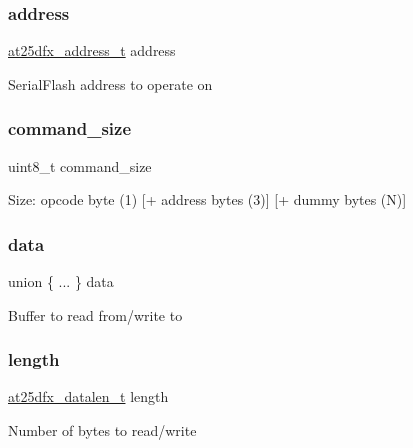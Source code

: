 \subsubsection{\texorpdfstring{address}{address}}
{\footnotesize\ttfamily \mbox{\hyperlink{group__asfdoc__common2__at25dfx__group_ga6797a814b041014cef23de480c9da9ef}{at25dfx\+\_\+address\+\_\+t}} address}

Serial\+Flash address to operate on \mbox{\label{structat25dfx__command_a524935062171f0d36ba3552566e448a2}} 
\subsubsection{\texorpdfstring{command\_size}{command\_size}}
{\footnotesize\ttfamily uint8\+\_\+t command\+\_\+size}

Size\+: opcode byte (1) \mbox{[}+ address bytes (3)\mbox{]} \mbox{[}+ dummy bytes (N)\mbox{]} \mbox{\label{structat25dfx__command_aa278fbfc4827c8708fac562bfa7ced88}} 
\subsubsection{\texorpdfstring{data}{data}}
{\footnotesize\ttfamily union \{ ... \}   data}

Buffer to read from/write to \mbox{\label{structat25dfx__command_a9cf615645e4992ade7ce819f1fef286a}} 
\subsubsection{\texorpdfstring{length}{length}}
{\footnotesize\ttfamily \mbox{\hyperlink{group__asfdoc__common2__at25dfx__group_gaebf176d512c4cc61390aef7159ddccb9}{at25dfx\+\_\+datalen\+\_\+t}} length}

Number of bytes to read/write \mbox{\label{structat25dfx__command_a2b5b9e841d577861efac73dfaea3bbb3}} 
